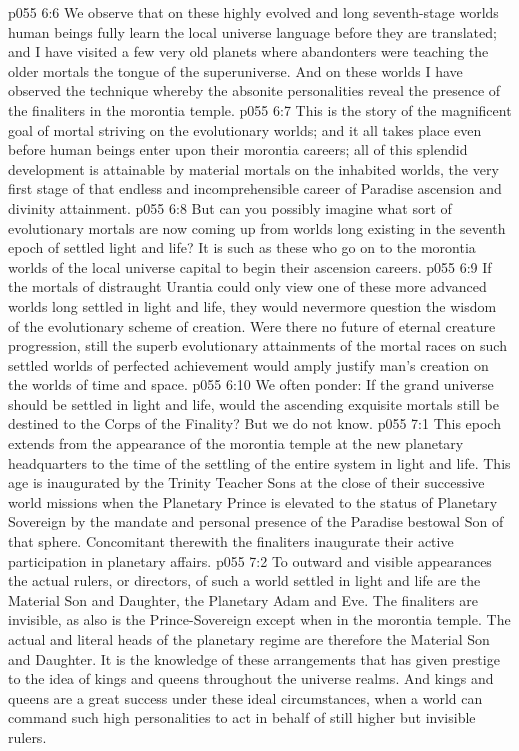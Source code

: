\vs p055 6:6 We observe that on these highly evolved and long seventh\hyp{}stage worlds human beings fully learn the local universe language before they are translated; and I have visited a few very old planets where abandonters were teaching the older mortals the tongue of the superuniverse. And on these worlds I have observed the technique whereby the absonite personalities reveal the presence of the finaliters in the morontia temple.
\vs p055 6:7 \pc This is the story of the magnificent goal of mortal striving on the evolutionary worlds; and it all takes place even before human beings enter upon their morontia careers; all of this splendid development is attainable by material mortals on the inhabited worlds, the very first stage of that endless and incomprehensible career of Paradise ascension and divinity attainment.
\vs p055 6:8 But can you possibly imagine what sort of evolutionary mortals are now coming up from worlds long existing in the seventh epoch of settled light and life? It is such as these who go on to the morontia worlds of the local universe capital to begin their ascension careers.
\vs p055 6:9 If the mortals of distraught Urantia could only view one of these more advanced worlds long settled in light and life, they would nevermore question the wisdom of the evolutionary scheme of creation. Were there no future of eternal creature progression, still the superb evolutionary attainments of the mortal races on such settled worlds of perfected achievement would amply justify man’s creation on the worlds of time and space.
\vs p055 6:10 We often ponder: If the grand universe should be settled in light and life, would the ascending exquisite mortals still be destined to the Corps of the Finality? But we do not know.
\vs p055 7:1 This epoch extends from the appearance of the morontia temple at the new planetary headquarters to the time of the settling of the entire system in light and life. This age is inaugurated by the Trinity Teacher Sons at the close of their successive world missions when the Planetary Prince is elevated to the status of Planetary Sovereign by the mandate and personal presence of the Paradise bestowal Son of that sphere. Concomitant therewith the finaliters inaugurate their active participation in planetary affairs.
\vs p055 7:2 To outward and visible appearances the actual rulers, or directors, of such a world settled in light and life are the Material Son and Daughter, the Planetary Adam and Eve. The finaliters are invisible, as also is the Prince\hyp{}Sovereign except when in the morontia temple. The actual and literal heads of the planetary regime are therefore the Material Son and Daughter. It is the knowledge of these arrangements that has given prestige to the idea of kings and queens throughout the universe realms. And kings and queens are a great success under these ideal circumstances, when a world can command such high personalities to act in behalf of still higher but invisible rulers.
